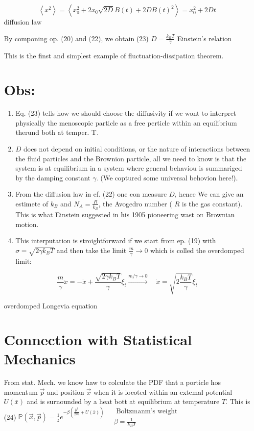 $$ \left\langle x^{2}\right\rangle=\left\langle x_{0}^{2}+2 x_{0} \sqrt{2 D} B(t)+2 D B(t)^{2}\right\rangle=x_{0}^{2}+2 D t $$
diffusion law

By componing op. (20) and (22), we obtain
(23) $D=\frac{k_{B} T}{\gamma}$ Einstein's relation

This is the finst and simplest example of fluctuation-dissipation theorem.

\section*{Obs:}
\begin{enumerate}
  \item Eq. (23) tells how we should choose the diffusivity if we wont to interpret physically the menoscopic particle as a free perticle within an equilibrium therund both at temper. T.
  \item $D$ does not depend on initial conditions, or the nature of interactions between the fluid particles and the Brownion particle, all we need to know is that the system is at equilibrium in a system where general behaviou is summariged by the damping constant $\gamma$. (We coptured some universal behovion here!).
  \item From the diffusion law in ef. (22) one con measure $D$, hence We can give an estimete of $k_{B}$ and $N_{A}=\frac{R}{k_{B}}$, the Avogedro number ( $R$ is the gas constant). This is what Einstein suggested in his 1905 pioneering wast on Brownian motion.
  \item This interputation is stroightforward if we start from ep. (19) with $\sigma=\sqrt{2 \gamma k_{B} T}$ and then take the limit $\frac{m}{\gamma} \rightarrow 0$ which is colled the overdomped limit:
\end{enumerate}

$$ \frac{m}{\gamma} \ddot{x}=-\dot{x}+\frac{\sqrt{2 \gamma k_{B} T}}{\gamma} \xi_{t} \xrightarrow{m / \gamma \rightarrow 0} \quad \dot{x}=\sqrt{2 \frac{k_{B} T}{\gamma}} \xi_{t} $$

overdomped Longevia equation

\section*{Connection with Statistical Mechanics}
From stat. Mech. we know haw to colculate the PDF that a porticle hos momentum $\vec{p}$ and position $\vec{x}$ when it is locoted within an extemal potential $U(\bar{x})$ and is surnounded by a heat bott at equilibrium at temperature $T$. This is
(24) $\mathbb{P}(\vec{x}, \vec{p})=\frac{1}{z} e^{-\beta\left(\frac{\bar{p}^{2}}{2 m}+U(\bar{x})\right)} \quad \begin{gathered}\text { Boltzmanm's weight } \\ \beta=\frac{1}{k_{B} T}\end{gathered}$

